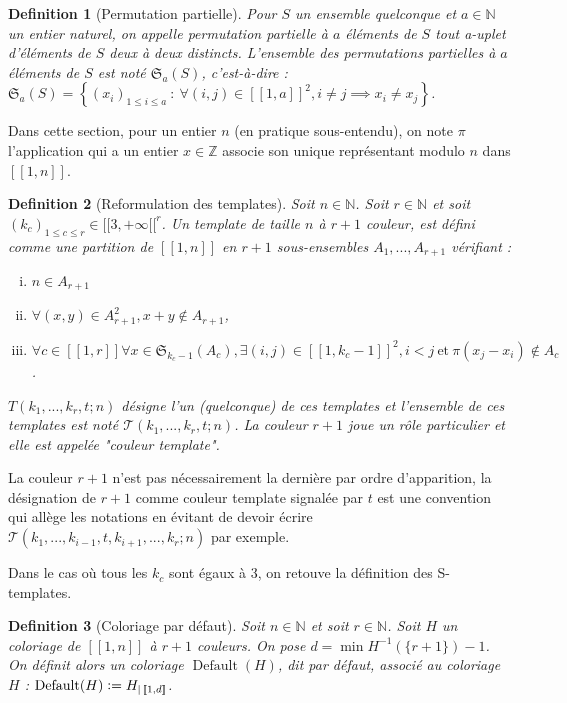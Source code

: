 \documentclass{article}
\newtheorem{definition}{Definition}[section]
\DeclareMathOperator{\coldef}{Default}
\newcommand{\defeq}{\vcentcolon=}
\begin{document}
\begin{definition}[Permutation partielle]
Pour \(S\) un ensemble quelconque et \(a \in \mathbb{N}\) un entier naturel, on appelle permutation partielle à \(a\) éléments de \(S\) tout a-uplet d'éléments de \(S\) deux à deux distincts. L'ensemble des permutations partielles à \(a\) éléments de \(S\) est noté \(\mathfrak{S}_a(S)\), c'est-à-dire : \(\mathfrak{S}_a(S) = \left\{ (x_i)_{1 \leqslant i \leqslant a} ~:~ \forall (i, j) \in [\![1, a]\!]^2, i \neq j \implies x_i \neq x_j \right\}\).
\end{definition}

Dans cette section, pour un entier \(n\) (en pratique sous-entendu), on note \(\pi\) l'application qui a un entier \(x \in \mathbb{Z}\) associe son unique représentant modulo \(n\) dans \([\![1, n]\!]\).

\begin{definition}[Reformulation des templates]
Soit \(n \in \mathbb{N}\). Soit \(r \in \mathbb{N}\) et soit \((k_c)_{1 \leqslant c \leqslant r} \in {[\![3, +\infty[\![}^r\). Un template de taille \(n\) à \(r + 1\) couleur, est défini comme une partition de \([\![1, n]\!]\) en \(r+1\) sous-ensembles \(A_1, ..., A_{r+1}\) vérifiant : 
\begin{enumerate}[(i)]
\item \(n \in A_{r+1}\)
\item \(\forall (x,y) \in A_{r+1}^2, x + y \notin A_{r+1}\),
\item \(\forall c \in [\![1, r]\!] \forall x \in \mathfrak{S}_{k_c - 1}(A_c), \exists (i, j) \in {[\![1, k_c - 1]\!]}^2, i < j ~\text{et}~ \pi(x_j - x_i) \notin A_c\).
\end{enumerate}
 \(T(k_1, ..., k_r, t; n)\) désigne l'un (quelconque) de ces templates et l'ensemble de ces templates est noté \(\mathcal{T}(k_1, ..., k_r, t; n)\). La couleur \(r + 1\) joue un rôle particulier et elle est appelée "couleur template".
\end{definition}

La couleur \(r + 1\)  n'est pas nécessairement la dernière par ordre d'apparition, la désignation de \(r+1\) comme couleur template signalée par \(t\) est une convention qui allège les notations en évitant de devoir écrire \(\mathcal{T}(k_1, ..., k_{i - 1}, t,  k_{i + 1}, ..., k_r; n)\) par exemple.

Dans le cas où tous les \(k_c\) sont égaux à 3, on retouve la définition des S-templates.

\begin{definition}[Coloriage par défaut]
Soit \(n \in \mathbb{N}\) et soit \(r \in \mathbb{N}\). Soit \(H\) un coloriage de \([\![1, n]\!]\) à \(r +1\) couleurs. On pose \(d = \min H^{-1}(\{r + 1\}) - 1\). On définit alors un coloriage \(\coldef(H)\), dit par défaut, associé au coloriage \(H\) : \(\coldef(H) \defeq H_{|\,[\![1, d]\!]}\).
\end{definition}
\end{document}
